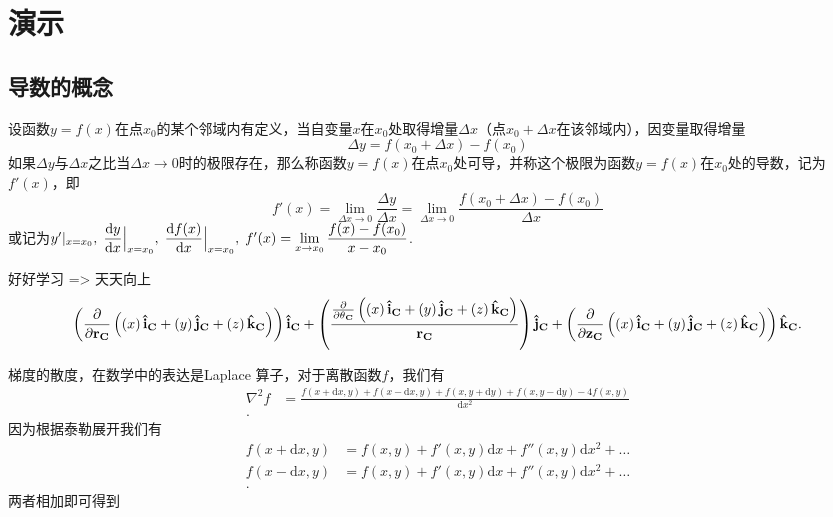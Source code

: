 \ifx\allfiles\undefined


% 
\else
\fi

\chapter{演示}
\section{导数的概念}

\begin{defn}
设函数$y=f(x)$在点$x_0$的某个邻域内有定义，当自变量$x$在$x_0$处取得增量$\Delta{x}$（点$x_0+\Delta{x}$在该邻域内），因变量取得增量
\[ \Delta{y}=f(x_0+\Delta{x})-f(x_0) \]
如果$\Delta{y}$与$\Delta{x}$之比当$\Delta{x}\to 0$时的极限存在，那么称函数$y=f(x)$在点$x_0$处可导，并称这个极限为函数$y=f(x)$在$x_0$处的导数，记为$f'(x)$，即
\[
f'(x) = \lim_{\Delta{x}\to0}\frac{\Delta{y}}{\Delta{x}} = \lim_{\Delta{x}\to 0}\frac{f(x_0+\Delta{x})-f(x_0)}{\Delta{x}}
\]
或记为$y'|_{x=x_0},\;\dfrac{\textup{d} y}{\textup{d} x}\Big|_{x = x_0},\;\dfrac{\textup{d} f(x)}{\textup{d} x}\Big|_{x=x_0},\;f'(x) = \lim\limits_{x\to x_0}\dfrac{f(x)-f(x_0)}{x-x_0}$.
\end{defn}

\begin{lemma}[瞎编的引理]
好好学习 => 天天向上 
\[
		\left(\frac{\partial}{\partial \mathbf{{r}_{C}}} \left(\left(x\right)\mathbf{\hat{i}_{C}} + \left(y\right)\mathbf{\hat{j}_{C}} + \left(z\right)\mathbf{\hat{k}_{C}}\right)\right)\mathbf{\hat{i}_{C}} + \left(\frac{\frac{\partial}{\partial \mathbf{{\\\theta}_{C}}} \left(\left(x\right)\mathbf{\hat{i}_{C}} + \left(y\right)\mathbf{\hat{j}_{C}} + \left(z\right)\mathbf{\hat{k}_{C}}\right)}{\mathbf{{r}_{C}}}\right)\mathbf{\hat{j}_{C}} + \left(\frac{\partial}{\partial \mathbf{{z}_{C}}} \left(\left(x\right)\mathbf{\hat{i}_{C}} + \left(y\right)\mathbf{\hat{j}_{C}} + \left(z\right)\mathbf{\hat{k}_{C}}\right)\right)\mathbf{\hat{k}_{C}}
.\]  
\end{lemma}


\begin{thm}[离散函数的梯度的散度]
梯度的散度，在数学中的表达是Laplace 算子，对于离散函数$ f $，我们有
\begin{align*}
		\nabla^2 f &= \frac{f(x+\mathrm{d}x,y) + f(x-\mathrm{d}x,y) + f(x,y+\mathrm{d}y)+ f(x,y-\mathrm{d}y)  - 4f(x,y) }{\mathrm{d}x^2 }  \\
.\end{align*}
		因为根据泰勒展开我们有
	\begin{align*}
			f(x+\mathrm{d}x ,y) &=  f(x,y) + f'(x,y)\mathrm{d}x + f''(x,y) \mathrm{d}x^2 +\ldots\\
			f(x-\mathrm{d}x ,y) &=  f(x,y) + f'(x,y)\mathrm{d}x + f''(x,y) \mathrm{d}x^2 +\ldots\\
	.\end{align*}	
	两者相加即可得到
\end{thm}

